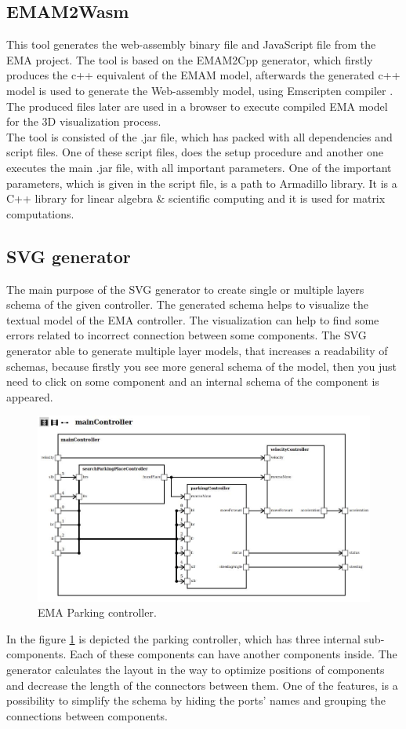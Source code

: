 \subsection{EMAM2Wasm} \label{sec:emam2wasm}
This tool generates the web-assembly binary file and JavaScript file from the EMA project. The tool is based on the EMAM2Cpp generator, which firstly produces the c++ equivalent of the EMAM model, afterwards the generated c++ model is used to generate the Web-assembly model, using Emscripten compiler \cite{Emscripten}. The produced files later are used in a browser to execute compiled EMA model for the 3D visualization process. \\
The tool is consisted of the .jar file, which has packed with all dependencies and script files. One of these script files, does the setup procedure and another one executes the main .jar file, with all important parameters. One of the important parameters, which is given in the script file, is a path to Armadillo \cite{Armadillo} library. It is a C++ library for linear algebra \& scientific computing and it is used for matrix computations.
\subsection{SVG generator} \label{sec:svggen}
The main purpose of the SVG generator to create single or multiple layers schema of the given controller. The generated schema helps to visualize the textual model of the EMA controller. The visualization can help to find some errors related to incorrect connection between some components. The SVG generator able to generate multiple layer models, that increases a readability of schemas, because firstly you see more general schema of the model, then you just need to click on some component and an internal schema of the component is appeared.
\begin{figure}[h!]
    \centering
    \includegraphics[width=\linewidth]{src/pic/controller03}
    \caption{EMA Parking controller.}
    \label{fig:parking}
\end{figure}
In the figure \ref{fig:parking} is depicted the parking controller, which has three internal sub-components. Each of these components can have another components inside. The generator calculates the layout in the way to optimize positions of components and decrease the length of the connectors between them. One of the features, is a possibility to simplify the schema by hiding the ports' names and grouping the connections between components.
